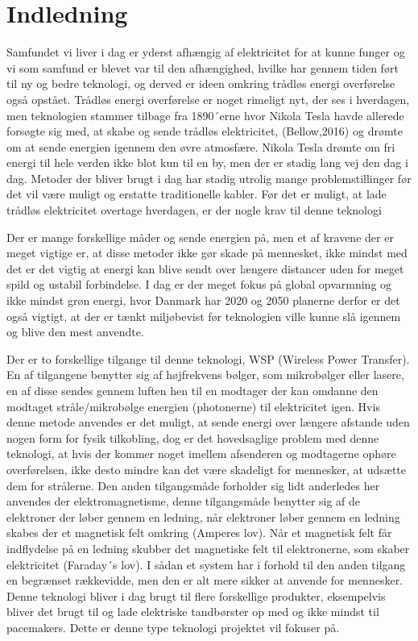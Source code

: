 \chapter{Indledning}
Samfundet vi liver i dag er yderst afhængig af elektricitet for at kunne funger og vi som samfund er blevet var til den afhængighed, hvilke har gennem tiden ført til ny og bedre teknologi, og derved er ideen omkring trådløs energi overførelse også opstået. Trådløs energi overførelse er noget rimeligt nyt, der ses i hverdagen, men teknologien stammer tilbage fra 1890´erne hvor Nikola Tesla havde allerede forsøgte sig med, at skabe og sende trådløs elektricitet, (Bellow,2016) og drømte om at sende energien igennem den øvre atmosfære. Nikola Tesla drømte om fri energi til hele verden ikke blot kun til en by, men der er stadig lang vej den dag i dag. Metoder der bliver brugt i dag har stadig utrolig mange problemstillinger før det vil være muligt og erstatte traditionelle kabler. Før det er muligt, at lade trådløs elektricitet overtage hverdagen, er der nogle krav til denne teknologi 

Der er mange forskellige måder og sende energien på, men et af kravene der er meget vigtige er, at disse metoder ikke gør skade på mennesket, ikke mindst med det er det vigtig at energi kan blive sendt over længere distancer uden for meget spild og ustabil forbindelse. I dag er der meget fokus på global opvarmning og ikke mindst grøn energi, hvor Danmark har 2020 og 2050 planerne derfor er det også vigtigt, at der er tænkt miljøbevist før teknologien ville kunne slå igennem og blive den mest anvendte.

Der er to forskellige tilgange til denne teknologi, WSP (Wireless Power Transfer). En af tilgangene benytter sig af højfrekvens bølger, som mikrobølger eller lasere, en af disse sendes gennem luften hen til en modtager der kan omdanne den modtaget stråle/mikrobølge energien (photonerne) til elektricitet igen. Hvis denne metode anvendes er det muligt, at sende energi over længere afstande uden nogen form for fysik tilkobling, dog er det hovedsaglige problem med denne teknologi, at hvis der kommer noget imellem afsenderen og modtagerne ophøre overførelsen, ikke desto mindre kan det være skadeligt for mennesker, at udsætte dem for strålerne. Den anden tilgangsmåde forholder sig lidt anderledes her anvendes der elektromagnetisme, denne tilgangsmåde benytter sig af de elektroner der løber gennem en ledning, når elektroner løber gennem en ledning skabes der et magnetisk felt omkring (Amperes lov).  Når et magnetisk felt får indflydelse på en ledning skubber det magnetiske felt  til elektronerne, som skaber elektricitet (Faraday´s lov). I sådan et system har i forhold til den anden tilgang en begrænset rækkevidde, men den er alt mere sikker at anvende for mennesker. Denne teknologi bliver i dag brugt til flere forskellige produkter, eksempelvis bliver det brugt til og lade elektriske tandbørster op med og ikke mindst til pacemakers. Dette er denne type teknologi projektet vil fokuser på. 
